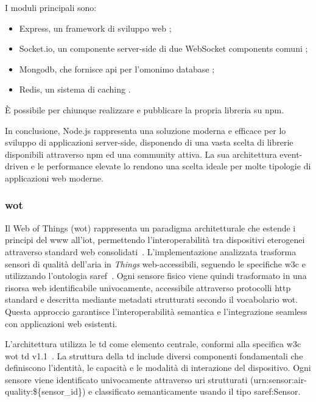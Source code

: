 I moduli principali sono:
\begin{itemize}
  \item Express, un framework di sviluppo web \cite{express_js};
  \item Socket.io, un componente server-side di due WebSocket components comuni \cite{socket_io};
  \item Mongodb, che fornisce \acrshort{api} per l'omonimo database \cite{mongodb};
  \item Redis, un sistema di caching \cite{redis}.
\end{itemize}
È possibile per chiunque realizzare e pubblicare la propria libreria su \acrfull{npm}.

In conclusione, Node.js rappresenta una soluzione moderna e efficace per lo sviluppo di applicazioni server-side,
disponendo di una vasta scelta di librerie disponibili attraverso \acrfull{npm} ed una community attiva.
La sua architettura event-driven e le performance elevate lo rendono una scelta ideale per molte tipologie
di applicazioni web moderne.

\subsubsection{\acrshort{wot}}

Il Web of Things (\acrshort{wot}) rappresenta un paradigma architetturale che estende i principi del \acrshort{www}
all'\acrshort{iot}, permettendo l'interoperabilità tra dispositivi eterogenei attraverso standard
web consolidati~\cite{w3c-wot-td}. L'implementazione analizzata trasforma sensori di qualità dell'aria in
\textit{Things} web-accessibili, seguendo le specifiche \acrshort{w3c} e utilizzando l'ontologia
\acrfull{saref}~\cite{saref-ontology}. Ogni sensore fisico viene quindi trasformato in una risorsa web
identificabile univocamente, accessibile attraverso protocolli \acrshort{http} standard e descritta mediante metadati
strutturati secondo il vocabolario \acrshort{wot}. Questa approccio garantisce l'interoperabilità semantica e
l'integrazione seamless con applicazioni web esistenti.

L'architettura utilizza le \acrfull{td} come elemento centrale, conformi alla specifica \acrshort{w3c} \acrshort{wot}
\acrlong{td} v1.1~\cite{w3c-wot-td}. La struttura della \acrshort{td} include diversi componenti fondamentali
che definiscono l'identità, le capacità e le modalità di interazione del dispositivo. Ogni sensore viene identificato
univocamente attraverso \acrshort{uri} strutturati (urn:sensor:air-quality:\$\{sensor\_id\}) e classificato
semanticamente usando il tipo saref:Sensor.

